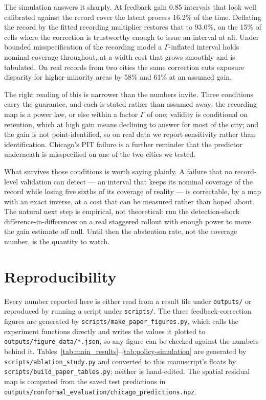\documentclass[journal,10pt,twocolumn]{IEEEtran}
\begin{document}
The simulation answers it sharply. At feedback gain 0.85 intervals that look well
calibrated against the record cover the latent process 16.2\% of the time.
Deflating the record by the fitted recording multiplier restores that to 93.0\%,
on the 15\% of cells where the correction is trustworthy enough to issue an
interval at all. Under bounded misspecification of the recording model a
$\Gamma$-inflated interval holds nominal coverage throughout, at a width cost that
grows smoothly and is tabulated. On real records from two cities the same
correction cuts exposure disparity for higher-minority areas by 58\% and 61\%
at an assumed gain.

The right reading of this is narrower than the numbers invite. Three conditions
carry the guarantee, and each is stated rather than assumed away: the recording
map is a power law, or else within a factor $\Gamma$ of one; validity is
conditional on retention, which at high gain means declining to answer for most
of the city; and the gain is not point-identified, so on real data we report
sensitivity rather than identification. Chicago's PIT failure is a further
reminder that the predictor underneath is misspecified on one of the two cities we
tested.

What survives those conditions is worth saying plainly. A failure that no
record-level validation can detect --- an interval that keeps its nominal coverage
of the record while losing five sixths of its coverage of reality --- is
correctable, by a map with an exact inverse, at a cost that can be measured
rather than hoped about. The natural next step is empirical, not theoretical: run
the detection-shock difference-in-differences on a real staggered rollout with
enough power to move the gain estimate off null. Until then the abstention rate,
not the coverage number, is the quantity to watch.

\section*{Reproducibility}
Every number reported here is either read from a result file under
\texttt{outputs/} or reproduced by running a script under \texttt{scripts/}. The
three feedback-correction figures are generated by
\texttt{scripts/make\_paper\_figures.py}, which calls the experiment functions
directly and writes the values it plotted to
\texttt{outputs/figure\_data/*.json}, so any figure can be checked against the
numbers behind it. Tables~\ref{tab:main_results}--\ref{tab:policy-simulation} are
generated by \texttt{scripts/ablation\_study.py} and converted to this
manuscript's floats by \texttt{scripts/build\_paper\_tables.py}; neither is
hand-edited. The spatial residual map is computed from the saved test predictions
in \texttt{outputs/conformal\_evaluation/chicago\_predictions.npz}.
\end{document}
